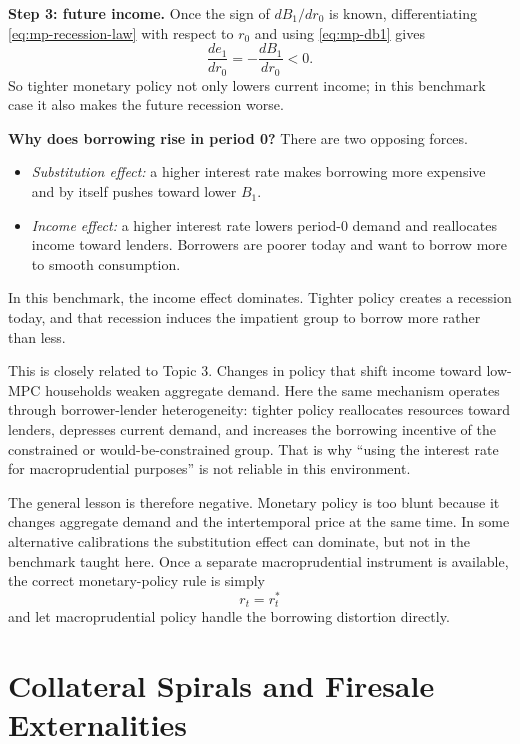 \documentclass[11pt,a4paper]{article}
\begin{document}
\textbf{Step 3: future income.} Once the sign of $dB_1/dr_0$ is known, differentiating \eqref{eq:mp-recession-law} with respect to $r_0$ and using \eqref{eq:mp-db1} gives
\begin{equation}\label{eq:mp-de1}
\frac{de_1}{dr_0} = -\frac{dB_1}{dr_0}<0.
\end{equation}
So tighter monetary policy not only lowers current income; in this benchmark case it also makes the future recession worse.

\textbf{Why does borrowing rise in period 0?} There are two opposing forces.
\begin{itemize}
    \item \textit{Substitution effect:} a higher interest rate makes borrowing more expensive and by itself pushes toward lower $B_1$.
    \item \textit{Income effect:} a higher interest rate lowers period-0 demand and reallocates income toward lenders. Borrowers are poorer today and want to borrow more to smooth consumption.
\end{itemize}
In this benchmark, the income effect dominates. Tighter policy creates a recession today, and that recession induces the impatient group to borrow more rather than less.

This is closely related to Topic 3. Changes in policy that shift income toward low-MPC households weaken aggregate demand. Here the same mechanism operates through borrower-lender heterogeneity: tighter policy reallocates resources toward lenders, depresses current demand, and increases the borrowing incentive of the constrained or would-be-constrained group. That is why ``using the interest rate for macroprudential purposes'' is not reliable in this environment.

The general lesson is therefore negative. Monetary policy is too blunt because it changes aggregate demand and the intertemporal price at the same time. In some alternative calibrations the substitution effect can dominate, but not in the benchmark taught here. Once a separate macroprudential instrument is available, the correct monetary-policy rule is simply
\begin{equation}
r_t = r_t^*
\end{equation}
and let macroprudential policy handle the borrowing distortion directly.


\section{Collateral Spirals and Firesale Externalities}\label{sec:firesale}
\end{document}
